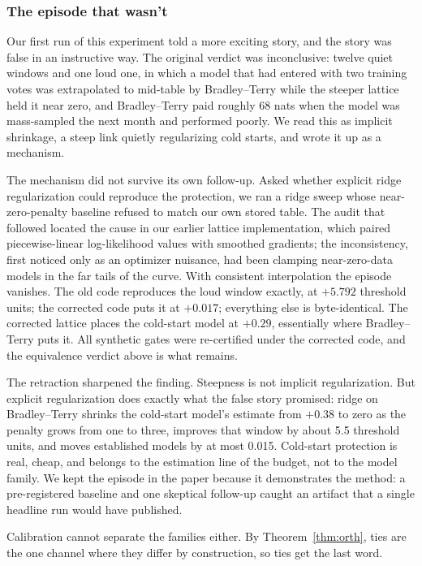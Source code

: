 \documentclass[10pt]{article}
\begin{document}
\subsubsection{The episode that wasn't}\label{sec:artifact}

Our first run of this experiment told a more exciting story, and the
story was false in an instructive way. The original verdict was
inconclusive: twelve quiet windows and one loud one, in which a
model that had entered with two training votes was extrapolated to
mid-table by Bradley--Terry while the steeper lattice held it near
zero, and Bradley--Terry paid roughly 68 nats when the model was
mass-sampled the next month and performed poorly. We read this as
implicit shrinkage, a steep link quietly regularizing cold starts,
and wrote it up as a mechanism.

The mechanism did not survive its own follow-up. Asked whether
explicit ridge regularization could reproduce the protection, we ran
a ridge sweep whose near-zero-penalty baseline refused to match our
own stored table. The audit that followed located the cause in our
earlier lattice implementation, which paired piecewise-linear
log-likelihood values with smoothed gradients; the inconsistency,
first noticed only as an optimizer nuisance, had been clamping
near-zero-data models in the far tails of the curve. With consistent
interpolation the episode vanishes. The old code reproduces the loud
window exactly, at $+5.792$ threshold units; the corrected code puts
it at $+0.017$; everything else is byte-identical. The corrected
lattice places the cold-start model at $+0.29$, essentially where
Bradley--Terry puts it. All synthetic gates were re-certified under
the corrected code, and the equivalence verdict above is what
remains.

The retraction sharpened the finding. Steepness is not implicit
regularization. But explicit regularization does exactly what the
false story promised: ridge on Bradley--Terry shrinks the cold-start
model's estimate from $+0.38$ to zero as the penalty grows from one
to three, improves that window by about 5.5 threshold units, and
moves established models by at most 0.015. Cold-start protection is
real, cheap, and belongs to the estimation line of the budget, not
to the model family. We kept the episode in the paper because it
demonstrates the method: a pre-registered baseline and one skeptical
follow-up caught an artifact that a single headline run would have
published.

Calibration cannot separate the families either. By
Theorem~\ref{thm:orth}, ties are the one channel where they differ
by construction, so ties get the last word.
\end{document}

